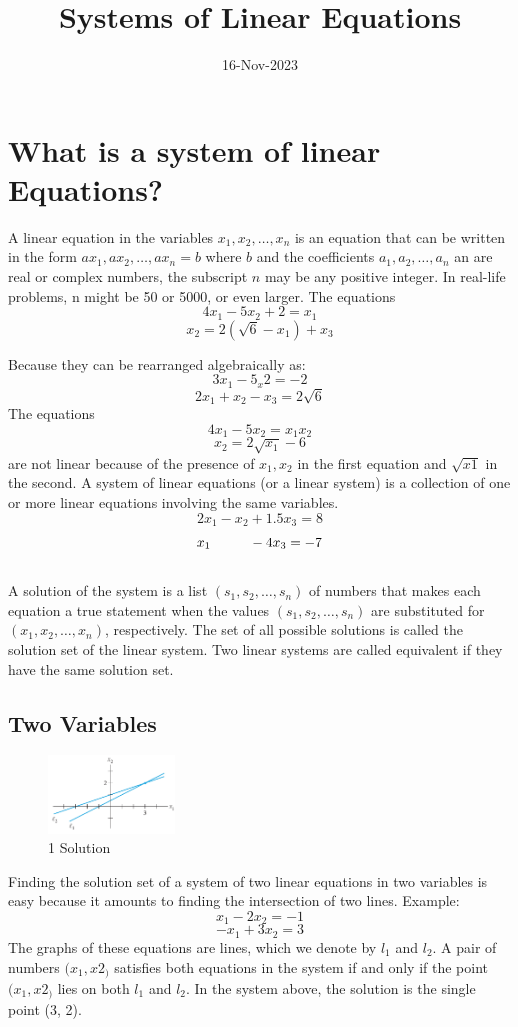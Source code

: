 \documentclass{article}
\title{Systems of Linear Equations}
\date{16-Nov-2023}
\begin{document}
\maketitle
\section{What is a system of linear Equations?}

A linear equation in the variables $x_1,x_2,\dots, x_n $ is an equation that can be written in the form $ax_1,ax_2,\dots, ax_n = b$ where $b$ and the coefficients $ a_1, a_2,\dots, a_n $ an are real or complex numbers, the subscript $n$ may be any positive integer. In real-life problems, n might be 50 or 5000, or even larger. The equations \newline $$4x_1 - 5x_2 + 2 = x_1$$ $$x_2 = 2(\sqrt{6} - x_1) + x_3$$ \newline

Because they can be rearranged algebraically as:
$$3x_1-5_x2 = -2$$
$$2x_1 + x_2 - x_3 = 2 \sqrt{6}$$ 
The equations $$4x_1 - 5x_2 = x_1x_2$$ $$x_2 = 2\sqrt{x_1} - 6$$\newline are not linear because of the presence of $x_1, x_2$ in the first equation and $\sqrt{x1}$ in the second. A system of linear equations (or a linear system) is a collection of one or more linear equations involving the same variables. $$2x_1 - x_2 + 1.5x_3 = 8$$ $$x_1 \hspace{10 mm} - 4x_3 = -7$$\\
A solution of the system is a list $(s_1,s_2,\dots, s_n)$ of numbers that makes each equation a true statement when the values $(s_1,s_2,\dots, s_n)$ are substituted for $(x_1,x_2,\dots, x_n)$, respectively.
The set of all possible solutions is called the solution set of the linear system. Two linear systems are called equivalent if they have the same solution set.\newline

\subsection{Two Variables}

\begin{figure} 
    \centering
    \includegraphics[width=0.3\textwidth]{image.png}
    \caption{1 Solution}
\end{figure}
Finding the solution set of a system of two linear equations in two variables is easy because it amounts to finding the intersection of two lines. Example: $$x_1 - 2x_2 = -1$$
$$-x_1 + 3x_2 = 3$$\newline
The graphs of these equations are lines, which we denote by $l_1$ and $l_2$. A pair of numbers $(x_1, x2_)$ satisfies both equations in the system if and only if the point $(x_1, x2_)$ lies on both $l_1$ and $l_2$. In the system above, the solution is the single point (3, 2).\pagebreak
\end{document}
